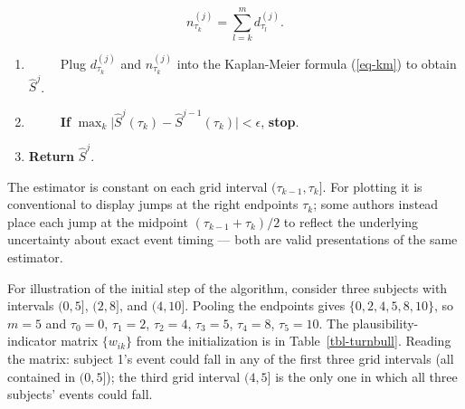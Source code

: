 \documentclass[
  letterpaper,
  krantz2]{style/krantz}
\providecommand{\tightlist}{%
  \setlength{\itemsep}{0pt}\setlength{\parskip}{0pt}}
\begin{document}
\begin{tcolorbox}
\[
n_{\tau_k}^{(j)} = \sum_{l=k}^{m} d_{\tau_l}^{(j)}.
\]

\begin{enumerate}
\def\labelenumi{\arabic{enumi}.}
\setcounter{enumi}{4}
\tightlist
\item
  ~~~~~Plug \(d_{\tau_k}^{(j)}\) and \(n_{\tau_k}^{(j)}\) into the
  Kaplan-Meier formula (\ref{eq-km}) to obtain \(\hat{S}^{j}\).
\item
  ~~~~~\textbf{If}
  \(\max_{k}\bigl\vert \hat{S}^{j}(\tau_k) - \hat{S}^{j-1}(\tau_k)\bigr\vert < \epsilon\),
  \textbf{stop}.
\item
  \textbf{Return} \(\hat{S}^{j}\).
\end{enumerate}

The estimator is constant on each grid interval
\((\tau_{k-1}, \tau_k]\). For plotting it is conventional to display
jumps at the right endpoints \(\tau_k\); some authors instead place each
jump at the midpoint \((\tau_{k-1} + \tau_k)/2\) to reflect the
underlying uncertainty about exact event timing --- both are valid
presentations of the same estimator.

\end{tcolorbox}

For illustration of the initial step of the algorithm, consider three
subjects with intervals \((0, 5]\), \((2, 8]\), and \((4, 10]\). Pooling
the endpoints gives \(\{0, 2, 4, 5, 8, 10\}\), so \(m=5\) and
\(\tau_0 = 0\), \(\tau_1 = 2\), \(\tau_2 = 4\), \(\tau_3 = 5\),
\(\tau_4 = 8\), \(\tau_5 = 10\). The plausibility-indicator matrix
\(\{w_{ik}\}\) from the initialization is in Table~\ref{tbl-turnbull}.
Reading the matrix: subject 1's event could fall in any of the first
three grid intervals (all contained in \((0, 5]\)); the third grid
interval \((4, 5]\) is the only one in which all three subjects' events
could fall.
\end{document}
